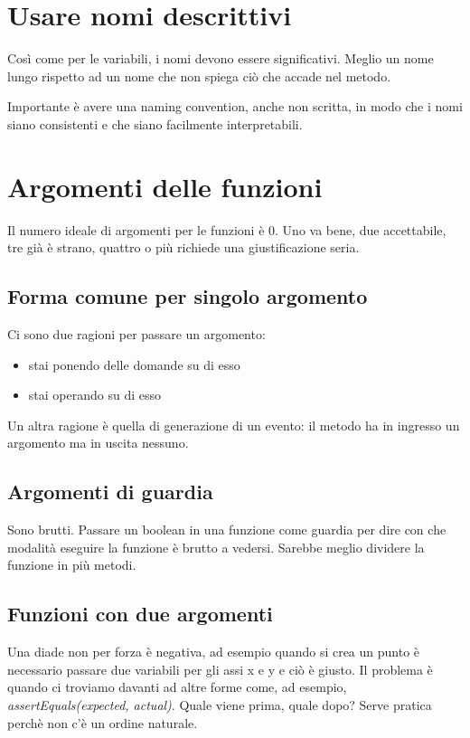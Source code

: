 \documentclass[11pt,a4paper]{book}
\begin{document}
\section{Usare nomi descrittivi}
Così come per le variabili, i nomi devono essere significativi. Meglio un nome lungo rispetto ad un nome che non spiega ciò che accade nel metodo.

Importante è avere una naming convention, anche non scritta, in modo che i nomi siano consistenti e che siano facilmente interpretabili.

\section{Argomenti delle funzioni}\label{par: argomenti funzioni}
Il numero ideale di argomenti per le funzioni è 0. Uno va bene, due accettabile, tre già è strano, quattro o più richiede una giustificazione seria.

\subsection{Forma comune per singolo argomento}
Ci sono due ragioni per passare un argomento:
\begin{itemize}
	\item stai ponendo delle domande su di esso
	\item stai operando su di esso
\end{itemize}

Un altra ragione è quella di generazione di un evento: il metodo ha in ingresso un argomento ma in uscita nessuno.

\subsection{Argomenti di guardia}\label{par: argomenti guardia}
Sono brutti. Passare un boolean in una funzione come guardia per dire con che modalità eseguire la funzione è brutto a vedersi. Sarebbe meglio dividere la funzione in più metodi.

\subsection{Funzioni con due argomenti}
Una diade non per forza è negativa, ad esempio quando si crea un punto è necessario passare due variabili per gli assi x e y e ciò è giusto. Il problema è quando ci troviamo davanti ad altre forme come, ad esempio, \emph{assertEquals(expected, actual)}. Quale viene prima, quale dopo? Serve pratica perchè non c'è un ordine naturale.
\end{document}
